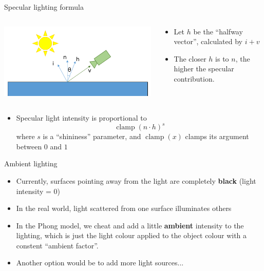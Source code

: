 \begin{frame}{Specular lighting formula}
	\begin{columns}
		\begin{column}{0.33\textwidth}
			\includegraphics[width=\textwidth]{specular_angle}
		\end{column}
		\begin{column}{0.65\textwidth}
			\begin{itemize}
				\pause\item Let $h$ be the ``halfway vector'', calculated by $i+v$
				\pause\item The closer $h$ is to $n$, the higher the specular contribution.
			\end{itemize}
		\end{column}
	\end{columns}
	\begin{itemize}
		\pause\item Specular light intensity is proportional to
		$$ \operatorname{clamp}(n \cdot h)^s $$
		where $s$ is a ``shininess'' parameter, and $\operatorname{clamp}(x)$ clamps its argument between $0$ and $1$
	\end{itemize}
\end{frame}

\begin{frame}{Ambient lighting}
	\begin{itemize}
		\pause\item Currently, surfaces pointing away from the light are completely \textbf{black} (light intensity = 0)
		\pause\item In the real world, light scattered from one surface illuminates others
		\pause\item In the Phong model, we cheat and add a little \textbf{ambient} intensity to the lighting, which is just the light colour applied to the object colour with a constent ``ambient factor''.
		\pause\item Another option would be to add more light sources...
	\end{itemize}
\end{frame}

